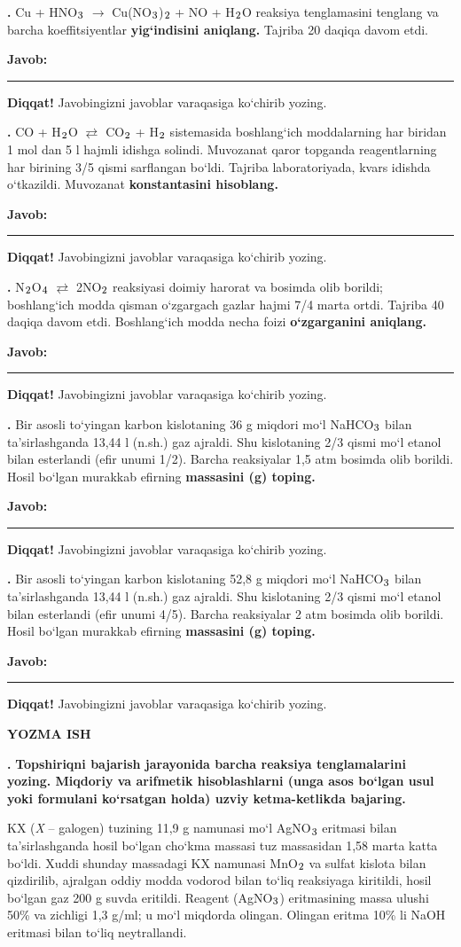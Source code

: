 \documentclass[11pt,a4paper]{article}
\renewcommand{\textsubscript}[1]{\ensuremath{_{\text{\fontsize{8}{8}\selectfont #1}}}}
\newcommand{\qn}[1]{\textbf{\fontsize{11.5}{13}\selectfont #1}}
\newcommand{\qsep}{\par\vspace{13pt}}
\newcommand{\javob}{\par\nopagebreak[4]\smallskip\noindent\textbf{Javob:} \rule[-2pt]{7.5cm}{0.4pt}\par\smallskip\noindent\textbf{Diqqat!} Javobingizni javoblar varaqasiga ko`chirib yozing.\par\medskip}
\begin{document}
\par\bigskip
\noindent\qn{36.} Cu + HNO\textsubscript{3} $\to$ Cu(NO\textsubscript{3})\textsubscript{2} + NO + H\textsubscript{2}O reaksiya tenglamasini tenglang va barcha koeffitsiyentlar \textbf{yig`indisini aniqlang.} Tajriba 20 daqiqa davom etdi.
\javob\qsep
\noindent\qn{37.} CO + H\textsubscript{2}O $\rightleftarrows$ CO\textsubscript{2} + H\textsubscript{2} sistemasida boshlang`ich moddalarning har biridan 1 mol dan 5 l hajmli idishga solindi. Muvozanat qaror topganda reagentlarning har birining 3/5 qismi sarflangan bo`ldi. Tajriba laboratoriyada, kvars idishda o`tkazildi. Muvozanat \textbf{konstantasini hisoblang.}
\javob\qsep
\noindent\qn{38.} N\textsubscript{2}O\textsubscript{4} $\rightleftarrows$ 2NO\textsubscript{2} reaksiyasi doimiy harorat va bosimda olib borildi; boshlang`ich modda qisman o`zgargach gazlar hajmi 7/4 marta ortdi. Tajriba 40 daqiqa davom etdi. Boshlang`ich modda necha foizi \textbf{o`zgarganini aniqlang.}
\javob\qsep
\noindent\qn{39.} Bir asosli to`yingan karbon kislotaning 36 g miqdori mo`l NaHCO\textsubscript{3} bilan ta'sirlashganda 13,44 l (n.sh.) gaz ajraldi. Shu kislotaning 2/3 qismi mo`l etanol bilan esterlandi (efir unumi 1/2). Barcha reaksiyalar 1,5 atm bosimda olib borildi. Hosil bo`lgan murakkab efirning \textbf{massasini (g) toping.}
\javob\qsep
\noindent\qn{40.} Bir asosli to`yingan karbon kislotaning 52,8 g miqdori mo`l NaHCO\textsubscript{3} bilan ta'sirlashganda 13,44 l (n.sh.) gaz ajraldi. Shu kislotaning 2/3 qismi mo`l etanol bilan esterlandi (efir unumi 4/5). Barcha reaksiyalar 2 atm bosimda olib borildi. Hosil bo`lgan murakkab efirning \textbf{massasini (g) toping.}
\javob\qsep
\par\bigskip\begin{center}\textbf{\fontsize{13}{15}\selectfont YOZMA ISH}\end{center}
\noindent\qn{41.} \textbf{Topshiriqni bajarish jarayonida barcha reaksiya tenglamalarini yozing. Miqdoriy va arifmetik hisoblashlarni (unga asos bo`lgan usul yoki formulani ko`rsatgan holda) uzviy ketma-ketlikda bajaring.}\par\smallskip
KX (\textit{X} -- galogen) tuzining 11,9 g namunasi mo`l AgNO\textsubscript{3} eritmasi bilan ta'sirlashganda hosil bo`lgan cho`kma massasi tuz massasidan 1,58 marta katta bo`ldi. Xuddi shunday massadagi KX namunasi MnO\textsubscript{2} va sulfat kislota bilan qizdirilib, ajralgan oddiy modda vodorod bilan to`liq reaksiyaga kiritildi, hosil bo`lgan gaz 200 g suvda eritildi. Reagent (AgNO\textsubscript{3}) eritmasining massa ulushi 50\% va zichligi 1,3 g/ml; u mo`l miqdorda olingan. Olingan eritma 10\% li NaOH eritmasi bilan to`liq neytrallandi.\par
\end{document}
